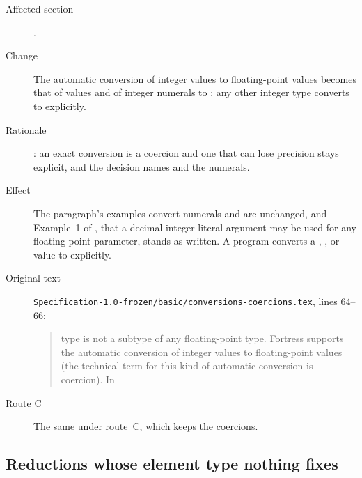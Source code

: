 \begin{description}
\item[Affected section] .
\item[Change] The automatic conversion of integer values to floating-point values
becomes that of  values and of integer numerals to
; any other integer type converts to 
explicitly.
\item[Rationale] : an exact conversion is a coercion and one
that can lose precision stays explicit, and the decision names 
and the numerals.
\item[Effect] The paragraph's examples convert numerals and are unchanged, and
Example~1 of , that a decimal integer literal argument may be
used for any floating-point parameter, stands as written.
A program converts a , ,  or
 value to  explicitly.
\item[Original text] \nolinkurl{Specification-1.0-frozen/basic/conversions-coercions.tex},
lines 64--66:
\begin{quote}
type is not a subtype of any floating-point type.  Fortress supports
the automatic conversion of integer values to floating-point values (the
technical term for this kind of automatic conversion is coercion).  In
\end{quote}
\item[Route C] The same under route~C, which keeps the coercions.
\end{description}

\subsection{Reductions whose element type nothing fixes}

